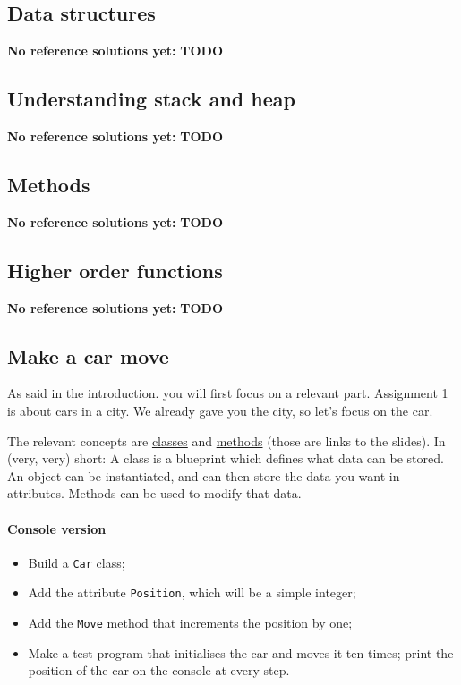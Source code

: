 \documentclass[12pt,a4paper,final]{article}
\begin{document}
		\subsection{Data structures}
			\textbf{No reference solutions yet:}
			\textbf{TODO}

		\subsection{Understanding stack and heap}
			\textbf{No reference solutions yet:}
			\textbf{TODO}

		\subsection{Methods}
			\textbf{No reference solutions yet:}
			\textbf{TODO}

		\subsection{Higher order functions}
			\textbf{No reference solutions yet:}
			\textbf{TODO}
						
					
	
		\subsection{Make a car move}
			As said in the introduction. you will first focus on a relevant part.
			Assignment 1 is about cars in a city.
			We already gave you the city, so let's focus on the car.
			
			The relevant concepts are \href{https://github.com/hogeschool/INFDEV02-2/raw/master/Slides/Lecture%20I%20-%20data%20structures.pdf}{classes} and \href{https://github.com/hogeschool/INFDEV02-2/raw/master/Slides/Lecture%20V%20-%20methods.pdf}{methods} (those are links to the slides).
				In (very, very) short: A class is a blueprint which defines what data can be stored.
				An object can be instantiated, and can then store the data you want in attributes.
				Methods can be used to modify that data.

			\paragraph*{Console version}
			\begin{itemize}
				\item Build a \texttt{Car} class;
				\item Add the attribute \texttt{Position}, which will be a simple integer;
				\item Add the \texttt{Move} method that increments the position by one;
				\item Make a test program that initialises the car and moves it ten times; print the position of the car on the console at every step.
			\end{itemize}
		
\end{document}
